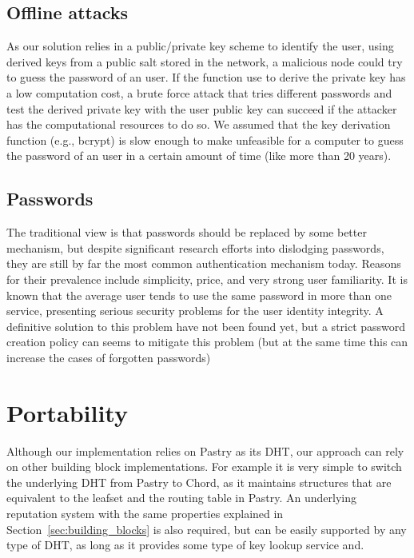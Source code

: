 \subsection{Offline attacks}
As our solution relies in a public/private key scheme to identify the user,
using derived keys from a public salt stored in the network, a malicious node
could try to guess the password of an user. If the function use to derive the
private key has a low computation cost, a brute force attack that tries
different passwords and test the derived private key with the user public key
can succeed if the attacker has the computational resources to do so. We
assumed that the key derivation function (e.g., bcrypt) is slow enough to make
unfeasible for a computer to guess the password of an user in a certain
amount of time (like more than 20 years).

\subsection{Passwords}
The traditional view is that passwords should be replaced by some better
mechanism, but despite significant research efforts into dislodging passwords,
they are still by far the most common authentication mechanism today.
Reasons for their prevalence include simplicity, price, and very strong user
familiarity.
It is known that the average user tends to use the
same password in more than one service, presenting serious security problems
for the user identity integrity. A definitive solution to this problem have not
been found yet, but a strict password creation policy can seems to mitigate this
problem (but at the same time this can increase the cases of forgotten passwords)


\section{Portability}

Although our implementation relies on Pastry as its DHT, our approach can rely
on other building block implementations. For example it is very simple to
switch the underlying DHT from Pastry to Chord, as it maintains structures
that are equivalent to the leafset and the routing table in Pastry. An
underlying reputation system with the same properties explained
in Section~\ref{sec:building_blocks}  is also required, but can be easily
supported by any type of DHT, as long as it provides some type of key lookup
service and.
